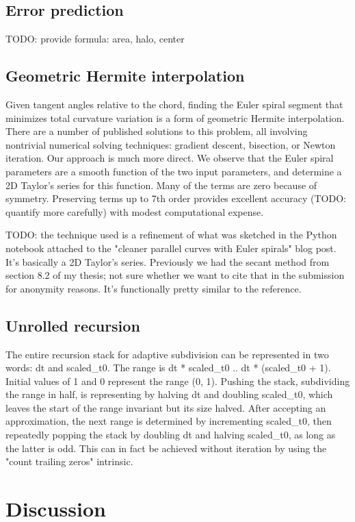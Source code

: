 \documentclass[format=acmsmall]{acmart}
\begin{document}
\subsection{Error prediction}

TODO: provide formula: area, halo, center

\subsection{Geometric Hermite interpolation}

Given tangent angles relative to the chord, finding the Euler spiral segment that minimizes total curvature variation is a form of geometric Hermite interpolation. There are a number of published solutions to this problem, all involving nontrivial numerical solving techniques: gradient descent\cite{Kimia2003}, bisection\cite{Walton2009}, or Newton iteration\cite{Connor2014}. Our approach is much more direct. We observe that the Euler spiral parameters are a smooth function of the two input parameters, and determine a 2D Taylor's series for this function. Many of the terms are zero because of symmetry. Preserving terms up to 7th order provides excellent accuracy (TODO: quantify more carefully) with modest computational expense.

TODO: the technique used is a refinement of what was sketched in the Python notebook attached to the "cleaner parallel curves with Euler spirals" blog post. It's basically a 2D Taylor's series. Previously we had the secant method from section 8.2 of my thesis; not sure whether we want to cite that in the submission for anonymity reasons. It's functionally pretty similar to the \cite{Connor2014} reference.

\subsection{Unrolled recursion}

The entire recursion stack for adaptive subdivision can be represented in two words: dt and scaled\_t0. The range is dt * scaled\_t0 .. dt * (scaled\_t0 + 1). Initial values of 1 and 0 represent the range (0, 1). Pushing the stack, subdividing the range in half, is representing by halving dt and doubling scaled\_t0, which leaves the start of the range invariant but its size halved. After accepting an approximation, the next range is determined by incrementing scaled\_t0, then repeatedly popping the stack by doubling dt and halving scaled\_t0, as long as the latter is odd. This can in fact be achieved without iteration by using the "count trailing zeros" intrinsic.

\section{Discussion}



\end{document}

